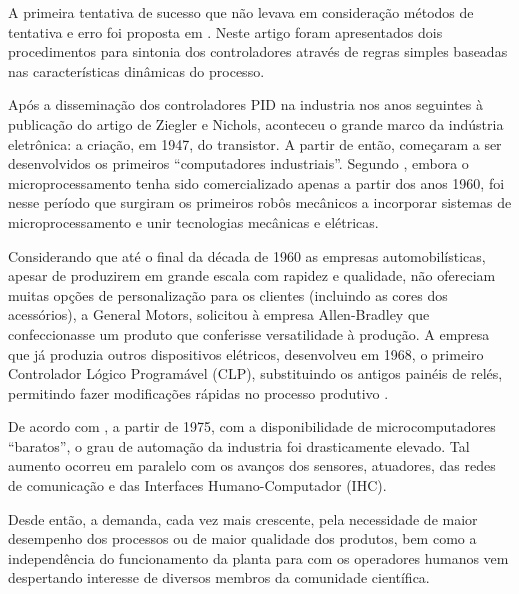 A primeira tentativa de sucesso que não levava em consideração métodos de
tentativa e erro foi proposta em . Neste artigo foram
apresentados dois procedimentos para sintonia dos controladores através de
regras simples baseadas nas características dinâmicas do processo.

Após a disseminação dos controladores PID na industria nos anos seguintes à
publicação do artigo de Ziegler e Nichols, aconteceu o grande marco da indústria
eletrônica: a criação, em 1947, do transistor. A partir de então, começaram a
ser desenvolvidos os primeiros ``computadores industriais''. Segundo
, embora o microprocessamento tenha sido comercializado
apenas a partir dos anos 1960, foi nesse período que surgiram os primeiros robôs
mecânicos a incorporar sistemas de microprocessamento e unir tecnologias
mecânicas e elétricas.

Considerando que até o final da década de 1960 as empresas automobilísticas,
apesar de produzirem em grande escala com rapidez e qualidade, não ofereciam
muitas opções de personalização para os clientes (incluindo as cores dos
acessórios), a General Motors, solicitou à empresa Allen-Bradley que
confeccionasse um produto que conferisse versatilidade à produção. A empresa que
já produzia outros dispositivos elétricos, desenvolveu em 1968, o primeiro
Controlador Lógico Programável (CLP), substituindo os antigos painéis de relés,
permitindo fazer modificações rápidas no processo produtivo \cite{goeking:2010}.


De acordo com , a partir de 1975, com a
disponibilidade de microcomputadores ``baratos'', o grau de automação da
industria foi drasticamente elevado. Tal aumento ocorreu em paralelo com os
avanços dos sensores, atuadores, das redes de comunicação e das Interfaces
Humano-Computador (IHC).


Desde então, a demanda, cada vez mais crescente, pela necessidade de maior
desempenho dos processos ou de maior qualidade dos produtos, bem como a
independência do funcionamento da planta para com os operadores humanos vem
despertando interesse de diversos membros da comunidade científica.


